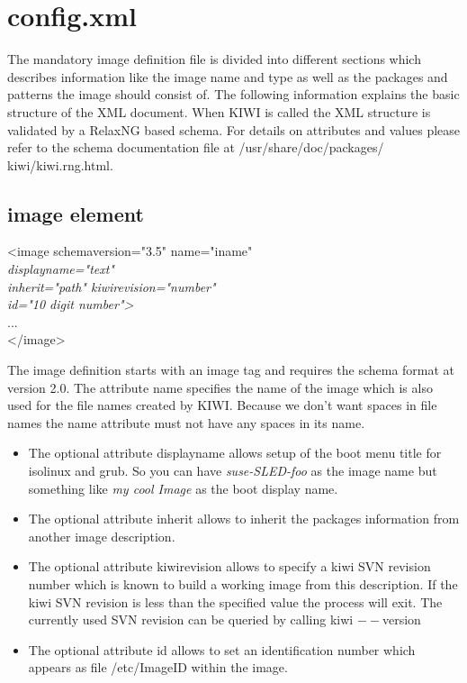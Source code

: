 \section{config.xml}
The mandatory image definition file is divided into different sections
which describes information like the image name and type as well as
the packages and patterns the image should consist of. The following
information explains the basic structure of the XML document. When KIWI
is called the XML structure is validated by a RelaxNG based schema.
For details on attributes and values please refer to the schema 
documentation file at /usr/share/doc/packages/ kiwi/kiwi.rng.html.

\subsection{image element}
\begin{Command}{12cm}
<image schemaversion="3.5" name="iname"\\
\hspace*{1.9cm}\textit{displayname="text"}\\
\hspace*{1.9cm}\textit{inherit="path" kiwirevision="number"}\\
\hspace*{1.9cm}\textit{id="10 digit number">}\\
\hspace*{1cm}...\\
</image>
\end{Command}

The image definition starts with an image tag and requires the
schema format at version 2.0. The attribute name specifies the
name of the image which is also used for the file names created
by KIWI. Because we don't want spaces in file names the name
attribute must not have any spaces in its name.

\begin{itemize}
\item The optional attribute displayname allows setup of the boot
      menu title for isolinux and grub. So you can have
      \textit{suse-SLED-foo} as the image name but something like
      \textit{my cool Image} as the boot display name.
\item The optional attribute inherit allows to inherit the
      packages information from another image description.
\item The optional attribute kiwirevision allows to specify
      a kiwi SVN revision number which is known to build
      a working image from this description. If the kiwi SVN
      revision is less than the specified value the
      process will exit. The currently used SVN revision can
      be queried by calling kiwi $--$version
\item The optional attribute id allows to set an identification
      number which appears as file /etc/ImageID within the
      image.
\end{itemize}

